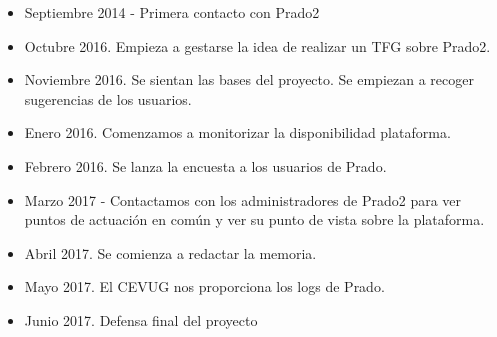 \begin{itemize}
	\item Septiembre 2014 - Primera contacto con Prado2

    \item Octubre 2016. Empieza a gestarse la idea de realizar un TFG sobre Prado2.
    
    \item Noviembre 2016. Se sientan las bases del proyecto. Se empiezan a recoger sugerencias de los usuarios.
    
    \item Enero 2016. Comenzamos a monitorizar la disponibilidad plataforma.
    
    \item Febrero 2016. Se lanza la encuesta a los usuarios de Prado.
    
    \item Marzo 2017 - Contactamos con los administradores de Prado2 para ver puntos de actuación en común y ver su punto de vista sobre la plataforma.
    
    \item Abril 2017. Se comienza a redactar la memoria.

    \item Mayo 2017. El CEVUG nos proporciona los logs de Prado.
    
    \item Junio 2017. Defensa final del proyecto

\end{itemize}
